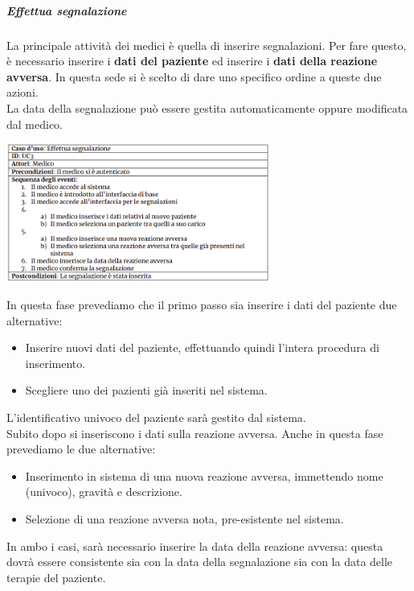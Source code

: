\documentclass{article}
\begin{document}
\subparagraph*{Effettua segnalazione}
La principale attività dei medici è quella di inserire segnalazioni. Per fare questo, è necessario
inserire i \textbf{dati del paziente} ed inserire i \textbf{dati della reazione avversa}. In questa sede si è scelto di dare uno specifico ordine a queste due azioni.\\
La data della segnalazione può essere gestita automaticamente oppure modificata dal medico.
\begin{center}
    \includegraphics[width=0.65\textwidth]{pictures/UC3.png}
\end{center}
In questa fase prevediamo che il primo passo sia inserire i dati del paziente due alternative:
\begin{itemize}
    \item Inserire nuovi dati del paziente, effettuando quindi l'intera procedura di inserimento.
    \item Scegliere uno dei pazienti già inseriti nel sistema.
\end{itemize}
L'identificativo univoco del paziente sarà gestito dal sistema.\\
Subito dopo si inseriscono i dati sulla reazione avversa.
Anche in questa fase prevediamo le due alternative:
\begin{itemize}
    \item Inserimento in sistema di una nuova reazione avversa, immettendo nome (univoco), gravità e descrizione.
    \item Selezione di una reazione avversa nota, pre-esistente nel sistema.
\end{itemize}
In ambo i casi, sarà necessario inserire la data della reazione avversa: questa dovrà essere consistente sia con la data della segnalazione sia con la data delle terapie del paziente.
\end{document}
